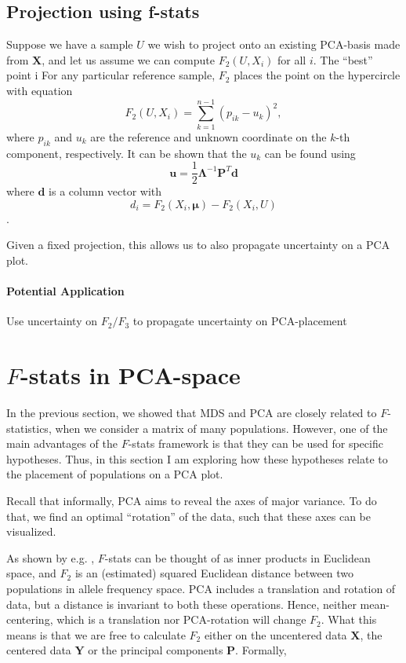 \documentclass[10pt,a4paper]{article}
\newcommand{\MX}{\mathbf{X}} %
\newcommand{\MY}{\mathbf{Y}} %
\newcommand{\MP}{\mathbf{P}} %
\newcommand{\MEIGEN}{\mathbf{\Lambda}} %
\newcommand{\MEAN}{\boldsymbol{\mu}} %
\begin{document}
\subsection{Projection using f-stats}
Suppose we have a sample $U$ we wish to project onto an existing PCA-basis made from $\MX$, and let us assume we can compute $F_2(U, X_i)$ for all $i$. The ``best'' point i
For any particular reference sample, $F_2$ places the point on the hypercircle with equation
\begin{equation}
F_2(U, X_i) = \sum_{k=1}^{n-1} (p_{ik} - u_k)^2,
\end{equation}
where $p_{ik}$ and $u_k$ are the reference and unknown coordinate on the $k$-th component, respectively. It can be shown \cite{gower1968} that the $u_k$ can be found using
\begin{equation}
\mathbf{u} = \frac{1}{2}\MEIGEN^{-1}\MP^T\mathbf{d}
\end{equation}
where $\mathbf{d}$ is a column vector with $$d_i = F_2(X_i, \MEAN) - F_2(X_i, U)$$.

Given a fixed projection, this allows us to also propagate uncertainty on a PCA plot.

\paragraph{Potential Application} Use uncertainty on $F_2/F_3$ to propagate uncertainty on PCA-placement


\section{$F$-stats in PCA-space}
In the previous section, we showed that MDS and PCA are closely related to $F$-statistics, when we consider a matrix of many populations. However, one of the main advantages of the $F$-stats framework is that they can be used for specific hypotheses. Thus, in this section I am exploring how these hypotheses relate to the placement of populations on a PCA plot.

Recall that informally, PCA aims to reveal the axes of major variance. To do that, we find an optimal ``rotation'' of the data, such that these axes can be visualized. 

As shown by e.g. \cite{oteo-garcia2021}, $F$-stats can be thought of as inner products in Euclidean space, and $F_2$ is an (estimated) squared Euclidean distance between two populations in allele frequency space. PCA includes a translation and rotation of data, but a distance is invariant to both these operations. Hence, neither mean-centering, which is a translation nor PCA-rotation will change $F_2$. What this means is that we are free to calculate $F_2$ either on the uncentered data $\MX$, the centered data $\MY$ or the principal components $\MP$. Formally,
\end{document}
